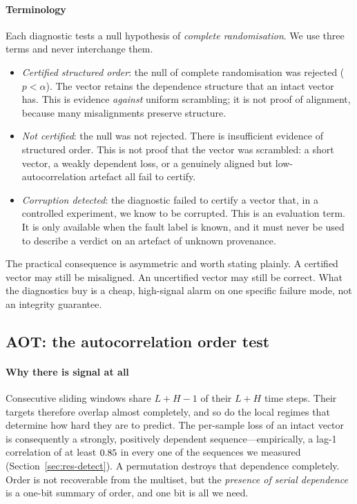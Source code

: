\documentclass[a4paper,fleqn]{cas-sc}
\begin{document}
\paragraph{Terminology}
Each diagnostic tests a null hypothesis of \emph{complete randomisation}. We use
three terms and never interchange them.
\begin{itemize}
\item \emph{Certified structured order}: the null of complete randomisation was
rejected ($p < \alpha$). The vector retains the dependence structure that an
intact vector has. This is evidence \emph{against} uniform scrambling; it is not
proof of alignment, because many misalignments preserve structure.
\item \emph{Not certified}: the null was not rejected. There is insufficient
evidence of structured order. This is not proof that the vector was scrambled: a
short vector, a weakly dependent loss, or a genuinely aligned but
low-autocorrelation artefact all fail to certify.
\item \emph{Corruption detected}: the diagnostic failed to certify a vector that,
in a controlled experiment, we know to be corrupted. This is an evaluation term.
It is only available when the fault label is known, and it must never be used to
describe a verdict on an artefact of unknown provenance.
\end{itemize}
The practical consequence is asymmetric and worth stating plainly. A certified
vector may still be misaligned. An uncertified vector may still be correct. What
the diagnostics buy is a cheap, high-signal alarm on one specific failure mode,
not an integrity guarantee.

\subsection{AOT: the autocorrelation order test}
\label{sec:aot}

\paragraph{Why there is signal at all}
Consecutive sliding windows share $L + H - 1$ of their $L+H$ time steps. Their
targets therefore overlap almost completely, and so do the local regimes that
determine how hard they are to predict. The per-sample loss of an intact vector is
consequently a strongly, positively dependent sequence---empirically, a lag-1
correlation of at least $0.85{}$ in every one of the \NumSequences{}
sequences we measured (Section~\ref{sec:res-detect}). A permutation destroys that dependence
completely. Order is not recoverable from the multiset, but the \emph{presence of
serial dependence} is a one-bit summary of order, and one bit is all we need.
\end{document}
